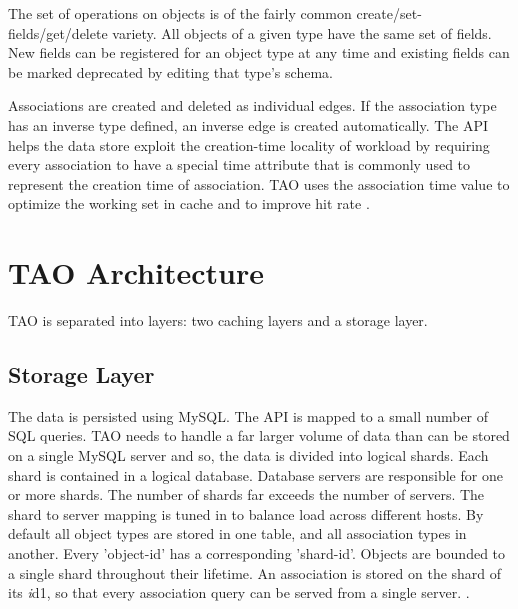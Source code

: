 \documentclass[9pt,twocolumn,twoside]{../../styles/osajnl}
\begin{document}
The set of operations on objects is of the fairly common create/set-fields/get/delete variety. All objects of a given type have the same set of fields. New fields can be registered for an object type at any time and existing fields can be marked deprecated by editing that type’s schema. 

Associations are created and deleted as individual edges. If the association type has an inverse type defined, an inverse edge is created automatically. The API helps the data store exploit the creation-time locality of workload by requiring every association to have a special time attribute that is commonly used to represent the creation time of association. TAO uses the association time value to optimize the working set in cache and to improve hit rate \cite{book-tao1}.

\section{TAO Architecture}

TAO is separated into layers: two caching layers and a storage layer.
\subsection{Storage Layer}

The data is persisted using MySQL. The API is mapped to a small number of SQL queries. TAO needs to handle a far larger volume of data than can be stored on a single MySQL server and so, the data is divided into logical shards. Each shard is contained in a logical database. Database servers are responsible for one or more shards. The number of shards far exceeds the number of servers. The shard to server mapping is tuned in to balance load across different hosts. By default all object types are stored in one table, and all association types in another. Every 'object-id' has a corresponding 'shard-id'. Objects are bounded to a single shard throughout their lifetime. An association is stored on the shard of its \emph id1, so that every association query can be served from a single server. \cite{www-tao4}.
\end{document}
